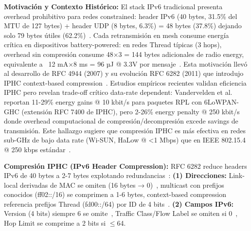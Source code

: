\textbf{Motivación y Contexto Histórico:} El stack IPv6 tradicional presenta overhead prohibitivo para redes constrained: header IPv6 (40 bytes, 31.5\% del MTU de 127 bytes) + header UDP (8 bytes, 6.3\%) = 48 bytes (37.8\%) dejando solo 79 bytes útiles (62.2\%)~\cite{shelby6LoWPANWirelessEmbedded2009,mamoImplementationStandardized6LoWPAN2015}. Cada retransmisión en mesh consume energía crítica en dispositivos battery-powered: en redes Thread típicas (3 hops), overhead sin compresión consume 48$\times$3 = 144 bytes adicionales de radio energy, equivalente a ~12 mA$\times$8 ms = 96 µJ @ 3.3V por mensaje~\cite{vanderveldenEvaluation6LoWPANGeneric2023}. Esta motivación llevó al desarrollo de RFC 4944 (2007) y su evolución RFC 6282 (2011) que introdujo IPHC context-based compression~\cite{shelby6LoWPANWirelessEmbedded2009}. Estudios empíricos recientes validan eficiencia IPHC pero revelan trade-off crítico data-rate dependent: Vandervelden et al.~\cite{vanderveldenEvaluation6LoWPANGeneric2023} reportan 11-29\% energy gains @ 10 kbit/s para paquetes RPL con 6LoWPAN-GHC (extensión RFC 7400 de IPHC), pero 2-26\% energy penalty @ 250 kbit/s donde overhead computacional de compresión/decompresión excede savings de transmisión. Este hallazgo sugiere que compresión IPHC es más efectiva en redes sub-GHz de bajo data rate (Wi-SUN, HaLow @ <1 Mbps) que en IEEE 802.15.4 @ 250 kbps estándar~\cite{vanderveldenEvaluation6LoWPANGeneric2023}.

\textbf{Compresión IPHC (IPv6 Header Compression):} RFC 6282 reduce headers IPv6 de 40 bytes a 2-7 bytes explotando redundancias~\cite{shelby6LoWPANWirelessEmbedded2009}: \textbf{(1) Direcciones:} Link-local derivadas de MAC se omiten (16 bytes → 0)~\cite{shelby6LoWPANWirelessEmbedded2009}, multicast con prefijos conocidos (ff02::/16) se comprimen a 1-6 bytes, context-based compression referencia prefijos Thread (fd00::/64) por ID de 4 bits~\cite{shelby6LoWPANWirelessEmbedded2009}. \textbf{(2) Campos IPv6:} Version (4 bits) siempre 6 se omite~\cite{shelby6LoWPANWirelessEmbedded2009}, Traffic Class/Flow Label se omiten si 0~\cite{shelby6LoWPANWirelessEmbedded2009}, Hop Limit se comprime a 2 bits si $\leq$64.

